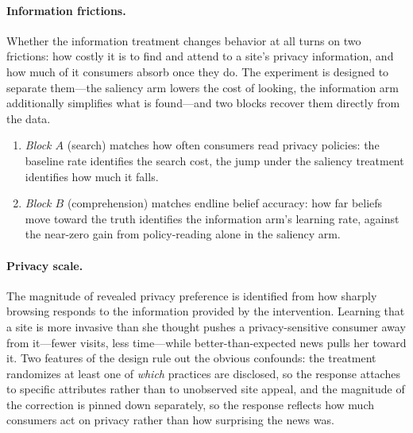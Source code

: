 \documentclass[12pt]{article}
\theoremstyle{definition}
\theoremstyle{remark}
\begin{document}
{\paragraph{Information frictions.} Whether the information treatment changes behavior at all turns on two frictions: how costly it is to find and attend to a site's privacy information, and how much of it consumers absorb once they do. The experiment is designed to separate them---the saliency arm lowers the cost of looking, the information arm additionally simplifies what is found---and two blocks recover them directly from the data. 
\begin{enumerate}
    \item \emph{Block $A$} (search) matches how often consumers read privacy policies: the baseline rate identifies the search cost, the jump under the saliency treatment identifies how much it falls. 
    \item \emph{Block $B$} (comprehension) matches endline belief accuracy: how far beliefs move toward the truth identifies the information arm's learning rate, against the near-zero gain from policy-reading alone in the saliency arm.
\end{enumerate} 


\paragraph{Privacy scale.} The magnitude of revealed privacy preference is identified from how sharply browsing responds to the information provided by the intervention. Learning that a site is more invasive than she thought pushes a privacy-sensitive consumer away from it---fewer visits, less time---while better-than-expected news pulls her toward it. Two features of the design rule out the obvious confounds: the treatment randomizes at least one of \emph{which} practices are disclosed, so the response attaches to specific attributes rather than to unobserved site appeal, and the magnitude of the correction is pinned down separately, so the response reflects how much consumers act on privacy rather than how surprising the news was.

}
\end{document}
